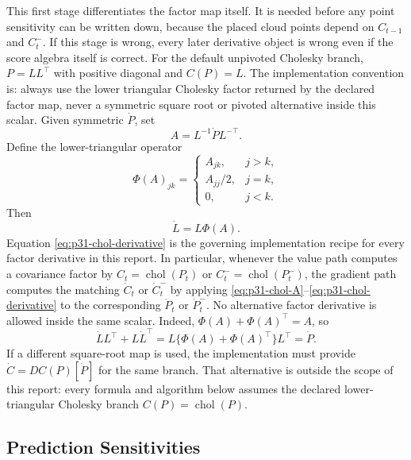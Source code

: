 \documentclass[11pt]{article}
\numberwithin{equation}{section}
\newcommand{\chol}{\operatorname{chol}}
\begin{document}
This first stage differentiates the factor map itself.  It is needed before any
point sensitivity can be written down, because the placed cloud points depend on
\(C_{t-1}\) and \(C_t^-\).  If this stage is wrong, every later derivative object
is wrong even if the score algebra itself is correct.  For the default
unpivoted Cholesky branch, \(P=LL^\top\) with positive diagonal and \(C(P)=L\).  The implementation convention is: always use the lower
triangular Cholesky factor returned by the declared factor map, never a
symmetric square root or pivoted alternative inside this scalar.  Given
symmetric \(\dot P\), set
\begin{equation}
  A=L^{-1}\dot P L^{-\top}.
  \label{eq:p31-chol-A}
\end{equation}
Define the lower-triangular operator
\begin{equation}
  \Phi(A)_{jk}
  =
  \begin{cases}
  A_{jk}, & j>k,\\
  A_{jj}/2, & j=k,\\
  0, & j<k.
  \end{cases}
  \label{eq:p31-chol-Phi}
\end{equation}
Then
\begin{equation}
  \dot L=L\Phi(A).
  \label{eq:p31-chol-derivative}
\end{equation}
Equation \eqref{eq:p31-chol-derivative} is the governing implementation recipe
for every factor derivative in this report.  In particular, whenever the value
path computes a covariance factor by \(C_t=\chol(P_t)\) or
\(C_t^-=\chol(P_t^-)\), the gradient path computes the matching
\(\dot C_t\) or \(\dot C_t^-\) by applying
\eqref{eq:p31-chol-A}--\eqref{eq:p31-chol-derivative} to the corresponding
\(\dot P_t\) or \(\dot P_t^-\).  No alternative factor derivative is allowed
inside the same scalar.
Indeed, \(\Phi(A)+\Phi(A)^\top=A\), so
\begin{equation}
  \dot LL^\top+L\dot L^\top
  =
  L\{\Phi(A)+\Phi(A)^\top\}L^\top
  =
  \dot P.
  \label{eq:p31-chol-check}
\end{equation}
If a different square-root map is used, the implementation must provide
\(\dot C=DC(P)[\dot P]\) for the same branch.  That alternative is outside the
scope of this report: every formula and algorithm below assumes the declared
lower-triangular Cholesky branch \(C(P)=\chol(P)\).

\subsection{Prediction Sensitivities}
\end{document}
